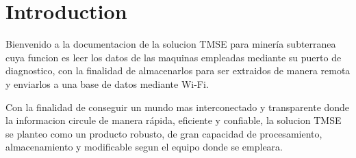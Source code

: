 
\section{Introduction}
\label{sec:introduction}
\setlength{\parskip}{1em}
Bienvenido a la documentacion de la solucion TMSE para minería subterranea cuya funcion es leer los
datos de las maquinas empleadas mediante su puerto de diagnostico, con la finalidad de almacenarlos para
ser extraidos de manera remota y enviarlos a una base de datos mediante Wi-Fi.

Con la finalidad de conseguir un mundo mas interconectado y transparente donde la informacion circule
de manera rápida, eficiente y confiable, la solucion TMSE se planteo como un producto robusto, de gran capacidad de procesamiento, almacenamiento y modificable segun el equipo donde se empleara.

\setlength{\parskip}{0pt}




